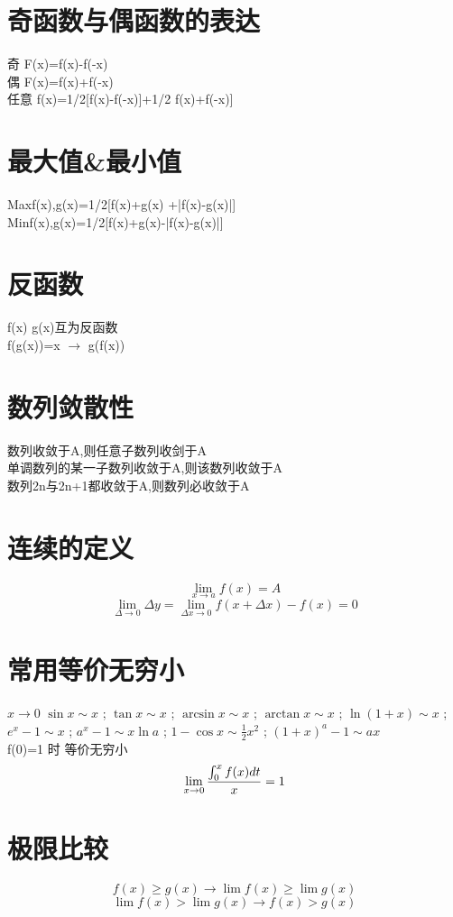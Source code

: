 \documentclass[UTF8]{ctexart}
\begin{document}
\section{奇函数与偶函数的表达}
奇 F(x)=f(x)-f(-x) \\
偶 F(x)=f(x)+f(-x) \\
任意 f(x)=1/2[f(x)-f(-x)]+1/2 f(x)+f(-x)]

\section{最大值\&最小值}
Max{f(x),g(x)}=1/2[f(x)+g(x) +|f(x)-g(x)|] \\
Min{f(x),g(x)}=1/2[f(x)+g(x)-|f(x)-g(x)|]

\section{反函数}
f(x)  g(x)互为反函数 \\
f(g(x))=x $\rightarrow$  g(f(x))

\section{数列敛散性}
数列收敛于A,则任意子数列收剑于A   \\
单调数列的某一子数列收敛于A,则该数列收敛于A \\
数列{2n}与{2n+1}都收敛于A,则数列必收敛于A

\section{连续的定义}
$$ \lim_{x\rightarrow a}f(x)=A$$
$$ \lim_{\Delta\rightarrow0}\Delta y=\lim_{\Delta x \rightarrow 0 } f(x+ \Delta x) - f(x)=0$$

\section{常用等价无穷小}
 $ x \rightarrow 0$
$ \sin x \sim x$ ; $ \tan x \sim x$ ; $ \arcsin x \sim x$ ; $ \arctan x \sim x$ ; $ \ln({1+x}) \sim x $ ; $ e^x -1 \sim x$ ; $ a^x -1 \sim x \ln a $ ; $ 1-\cos x \sim \frac{1}{2} x^2 $ ; $ {(1+x)}^a -1 \sim ax$ \\

f(0)=1 时 等价无穷小 \\
$$ \lim_{x \rightarrow 0 } {{\int_0^x f(x)dt} \over {x}} =1$$

\section{极限比较}
$$ f(x) \geq g(x) \rightarrow \lim f(x) \geq \lim g(x) $$
$$ \lim f(x) > \lim g(x) \rightarrow f(x) > g(x) $$
\end{document}
